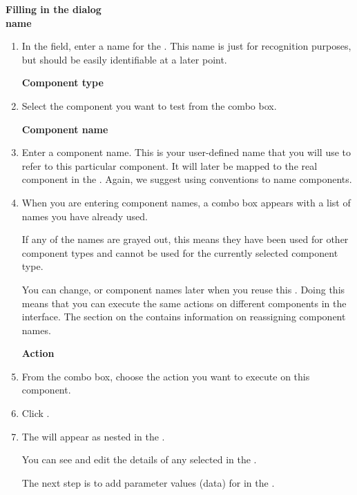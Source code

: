 \textbf{Filling in the \gdstep{} dialog}\\
\textbf{\gdstep{} name}
\begin{enumerate}
\item In the  field, enter a name for the \gdstep{}. This name is just for recognition 
purposes, but should be easily identifiable at a later point. 

\textbf{Component type}
\item Select the component you want to test from the combo box. 


\textbf{Component name}
\label{componentnameteststep}
\item Enter a component name. This is your user-defined name that you will use to refer to this particular component. It will later be mapped to the real component in the \gdaut{}. Again, we suggest using conventions to name components. 

\item When you are entering component names, a combo box appears with a list of names you have already used. 

If any of the names are grayed out, this means they have been used for other component types and cannot be used for the currently selected component type. 

You can change, or  component names later when you reuse this \gdcase{}. Doing this means that you can execute the same actions on different components in the interface. The section on the \gdcompnamesview{}  contains information on reassigning component names. 

\textbf{Action}

\item From the combo box, choose the action you want to execute on this component. 

\item Click . 
\item The \gdstep{} will appear as nested in the \gdcase{}.  

You can see and edit the details of any selected \gdstep{} in the \gdpropview{}.

The next step is to add parameter values (data) for \gdsteps{} in the \gdpropview{} . 
\end{enumerate}

 
